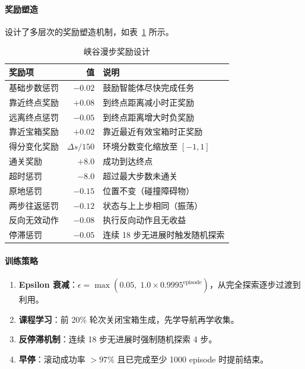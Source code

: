 \documentclass[12pt,a4paper]{article}
\begin{document}
\paragraph{奖励塑造}
设计了多层次的奖励塑造机制，如表~\ref{tab:hw1_reward} 所示。

\begin{table}[htbp]
\centering
\caption{峡谷漫步奖励设计}\label{tab:hw1_reward}
\begin{tabularx}{\textwidth}{lrX}
\toprule
\textbf{奖励项} & \textbf{值} & \textbf{说明} \\
\midrule
基础步数惩罚   & $-0.02$      & 鼓励智能体尽快完成任务 \\
靠近终点奖励   & $+0.08$      & 到终点距离减小时正奖励 \\
远离终点惩罚   & $-0.05$      & 到终点距离增大时负奖励 \\
靠近宝箱奖励   & $+0.02$      & 靠近最近有效宝箱时正奖励 \\
得分变化奖励   & $\Delta s/150$  & 环境分数变化缩放至 $[-1, 1]$ \\
通关奖励       & $+8.0$       & 成功到达终点 \\
超时惩罚       & $-8.0$       & 超过最大步数未通关 \\
原地惩罚       & $-0.15$      & 位置不变（碰撞障碍物） \\
两步往返惩罚   & $-0.12$      & 状态与上上步相同（振荡） \\
反向无效动作   & $-0.08$      & 执行反向动作且无收益 \\
停滞惩罚       & $-0.05$      & 连续 18 步无进展时触发随机探索 \\
\bottomrule
\end{tabularx}
\end{table}

\paragraph{训练策略}

\begin{enumerate}[nosep]
\item \textbf{Epsilon 衰减}：$\epsilon = \max(0.05,\; 1.0 \times 0.9995^{\text{episode}})$，从完全探索逐步过渡到利用。
\item \textbf{课程学习}：前 20\% 轮次关闭宝箱生成，先学导航再学收集。
\item \textbf{反停滞机制}：连续 18 步无进展时强制随机探索 4 步。
\item \textbf{早停}：滚动成功率 $> 97\%$ 且已完成至少 1000 episode 时提前结束。
\end{enumerate}
\end{document}
